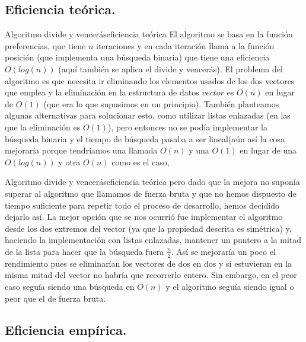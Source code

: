 \documentclass{beamer}
\begin{document}
\subsection{Eficiencia teórica.}

\begin{frame}{Algoritmo divide y vencerás}{eficiencia teórica}
El algoritmo se basa en la función preferencias, que tiene $n$ iteraciones y en cada iteración llama a la función posición (que implementa una búsqueda binaria) que tiene una eficiencia $O(log(n))$ (aquí también se aplica el divide y vencerás). El problema del algoritmo es que necesita ir eliminando los elementos usados de los dos vectores que emplea y la eliminación en la estructura de datos $vector$ es $O(n)$ en lugar de $O(1)$ (que era lo que supusimos en un principio). También planteamos algunas alternativas para solucionar esto, como utilizar listas enlazadas (en las que la eliminación es $O(1)$), pero entonces no se podía implementar la búsqueda binaria y el tiempo de búsqueda pasaba a ser lineal(aún así la cosa mejoraría porque tendríamos una llamada $O(n)$ y una $O(1)$ en lugar de una $O(log(n))$ y otra $O(n)$ como es el caso, 
\end{frame}
\begin{frame}{Algoritmo divide y vencerás}{eficiencia teórica}
pero dado que la mejora no suponía superar al algoritmo que llamamos de fuerza bruta y que no hemos dispuesto de tiempo suficiente para repetir todo el proceso de desarrollo, hemos decidido dejarlo así. La mejor opción que se nos ocurrió fue implementar el algoritmo desde los dos extremos del vector (ya que la propiedad descrita es simétrica) y, haciendo la implementación con listas enlazadas, mantener un puntero a la mitad de la lista para hacer que la búsqueda fuera $\frac{n}{2}$. Así se mejoraría un poco el rendimiento pues se eliminarían los vectores de dos en dos y si estuvieran en la misma mitad del vector no habría que recorrerlo entero. Sin embargo, en el peor caso seguía siendo una búsqueda en $O(n)$ y el algoritmo seguía siendo igual o peor que el de fuerza bruta.
\end{frame}
\subsection{Eficiencia empírica.}
\end{document}
